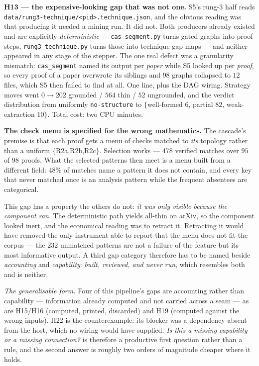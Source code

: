 \documentclass[11pt]{article}
\newcommand{\hz}[1]{\textsf{#1}}
\begin{document}
\textbf{\hz{H13} --- the expensive-looking gap that was not one.}
S5's rung-3 half reads
\texttt{data/rung3-technique/<pid>.technique.json}, and the obvious reading was
that producing it needed a mining run. It did not. Both producers already
existed and are explicitly \emph{deterministic} --- \texttt{cas\_segment.py}
turns gated graphs into proof steps, \texttt{rung3\_technique.py} turns those
into technique gap maps --- and neither appeared in any stage of the stepper.
The one real defect was a granularity mismatch: \texttt{cas\_segment} named its
output per \emph{paper} while S5 looked up per \emph{proof}, so every proof of a
paper overwrote its siblings and $98$ graphs collapsed to $12$ files, which S5
then failed to find at all. One line, plus the DAG wiring. Strategy moves went
$0 \to 202$ grounded / $564$ thin / $52$ ungrounded, and the verdict
distribution from uniformly \texttt{no-structure} to $\{$well-formed $6$,
partial $82$, weak-extraction $10\}$. Total cost: two CPU minutes.

\textbf{The check menu is specified for the wrong mathematics.} The cascade's
premise is that each proof gets a menu of checks matched to \emph{its} topology
rather than a uniform $\{$R2a,R2b,R2c$\}$. Selection works --- $478$ verified
matches over $95$ of $98$ proofs. What the selected patterns then meet is a menu
built from a different field: $48\%$ of matches name a pattern it does not
contain, and every key that never matched once is an analysis pattern while the
frequent absentees are categorical.

This gap has a property the others do not: \emph{it was only visible because the
component ran}. The deterministic path yields all-thin on arXiv, so the component
looked inert, and the economical reading was to retract it. Retracting it would
have removed the only instrument able to report that the menu does not fit the
corpus --- the $232$ unmatched patterns are not a failure of the feature but its
most informative output. A third gap category therefore has to be named beside
\emph{accounting} and \emph{capability}: \emph{built, reviewed, and never run},
which resembles both and is neither.

\emph{The generalisable form.} Four of this pipeline's gaps are accounting
rather than capability --- information already computed and not carried across a
seam --- as are \hz{H15}/\hz{H16} (computed, printed, discarded) and \hz{H19}
(computed against the wrong inputs). \hz{H22} is the counterexample: its blocker
was a dependency absent from the host, which no wiring would have supplied.
\emph{Is this a missing capability or a missing connection?} is therefore a
productive first question rather than a rule, and the second answer is roughly
two orders of magnitude cheaper where it holds.
\end{document}
